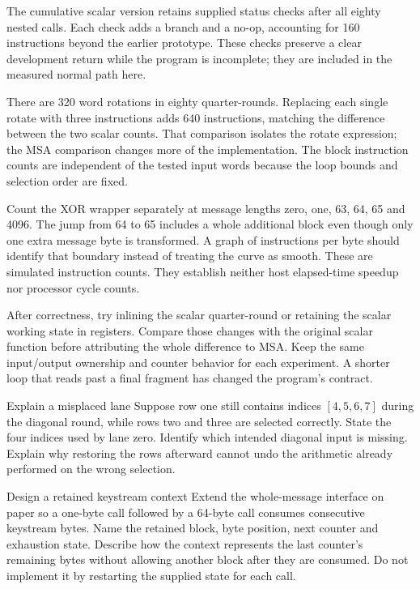 The cumulative scalar version retains supplied status checks after all eighty
nested calls. Each check adds a branch and a no-op, accounting for 160 instructions
beyond the earlier prototype. These checks preserve a clear development return while
the program is incomplete; they are included in the measured normal path here.

There are 320 word rotations in eighty quarter-rounds. Replacing each single
rotate with three instructions adds 640 instructions, matching the difference
between the two scalar counts. That comparison isolates the rotate expression;
the MSA comparison changes more of the implementation. The block instruction
counts are independent of the tested input words because the loop bounds and
selection order are fixed.

Count the XOR wrapper separately at message lengths zero, one, 63, 64, 65 and 4096.
The jump from 64 to 65 includes a whole additional block even though only one extra
message byte is transformed. A graph of instructions per byte should identify that
boundary instead of treating the curve as smooth. These are simulated instruction
counts. They establish neither host elapsed-time speedup nor processor cycle counts.

After correctness, try inlining the scalar quarter-round or retaining the scalar
working state in registers. Compare those changes with the original scalar function
before attributing the whole difference to MSA. Keep the same input/output ownership
and counter behavior for each experiment. A shorter loop that reads past a final
fragment has changed the program's contract.

\begin{MARSExercise}{Explain a misplaced lane}
  Suppose row one still contains indices \([4,5,6,7]\) during the diagonal round,
  while rows two and three are selected correctly. State the four indices used by lane
  zero. Identify which intended diagonal input is missing. Explain why restoring the
  rows afterward cannot undo the arithmetic already performed on the wrong selection.
\end{MARSExercise}
\begin{MARSExercise}{Design a retained keystream context}
  Extend the whole-message interface on paper so a one-byte call followed by a 64-byte
  call consumes consecutive keystream bytes. Name the retained block, byte position,
  next counter and exhaustion state. Describe how the context represents the last
  counter's remaining bytes without allowing another block after they are consumed.
  Do not implement it by restarting the supplied state for each call.
\end{MARSExercise}
